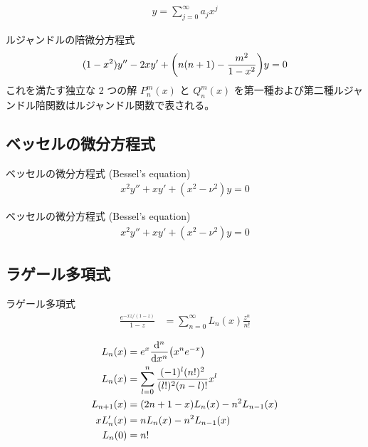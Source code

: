 \documentclass[uplatex,dvipdfmx,a4paper,11pt]{jlreq}
\theoremstyle{definition}
\begin{document}
\begin{align}
  y = \sum_{j=0}^{\infty}a_jx^j
\end{align}

\begin{definition}[ルジャンドルの陪微分方程式]
  ルジャンドルの陪微分方程式
  \begin{align}
    (1 - x^2)y'' - 2xy' + \qty(n(n + 1) - \frac{m^2}{1 - x^2})y = 0
  \end{align}
  これを満たす独立な 2 つの解 $P_n^m(x)$ と $Q_n^m(x)$ を第一種および第二種ルジャンドル陪関数はルジャンドル関数で表される。
\end{definition}

\subsection{ベッセルの微分方程式}
\begin{definition}
  ベッセルの微分方程式 (Bessel's equation)
  \begin{align}
    x^2y'' + xy' + (x^2 - \nu^2)y = 0
  \end{align}
\end{definition}
\begin{definition}
  ベッセルの微分方程式 (Bessel's equation)
  \begin{align}
    x^2y'' + xy' + (x^2 - \nu^2)y = 0
  \end{align}
\end{definition}

\subsection{ラゲール多項式}
\begin{definition}
  ラゲール多項式
  \begin{align}
    \frac{e^{-xz/(1-z)}}{1-z} & = \sum_{n=0}^{\infty}L_n(x)\frac{z^n}{n!}
  \end{align}
\end{definition}
\begin{proposition}
  \begin{align}
    L_n(x)     & = e^x\dv[n]{x}(x^ne^{-x})                            \\
    L_n(x)     & = \sum_{l=0}^{n}\frac{(-1)^l(n!)^2}{(l!)^2(n-l)!}x^l \\
    L_{n+1}(x) & = (2n + 1 - x)L_n(x) - n^2L_{n-1}(x)                 \\
    xL_n'(x)   & = nL_n(x) - n^2L_{n-1}(x)                            \\
    L_n(0)     & = n!
  \end{align}
\end{proposition}
\end{document}
